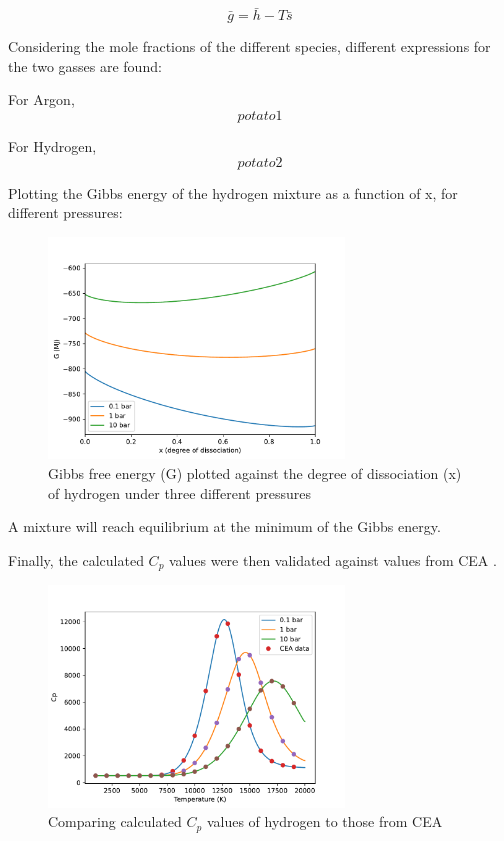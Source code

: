         \begin{equation}
            \bar g = \bar h - T \bar s
        \end{equation}

        Considering the mole fractions of the different species, different expressions for the two gasses are found:

        For Argon,
        \begin{equation}
            potato 1
        \end{equation}

        For Hydrogen,
        \begin{equation}
            potato 2
        \end{equation}


        Plotting the Gibbs energy of the hydrogen mixture as a function of x, for different pressures:

        \begin{figure}[!ht]
            \centering
            \includegraphics[width=0.7\textwidth]{assets/2 models/Gibbs.pdf}
            \caption{Gibbs free energy (G) plotted against the degree of dissociation (x) of hydrogen under three different pressures}
            \label{fig:Gibbs}
        \end{figure}

        A mixture will reach equilibrium at the minimum of the Gibbs energy.

        Finally, the calculated $C_p$ values were then validated against values from CEA \cite{CEARUNRev4}. 
        
        \begin{figure}[!ht]
            \centering
            \includegraphics[width=0.7\textwidth]{assets/2 models/Cp_compare.pdf}
            \caption{Comparing calculated $C_p$ values of hydrogen to those from CEA}
            \label{fig:Cp_compare}
        \end{figure}

